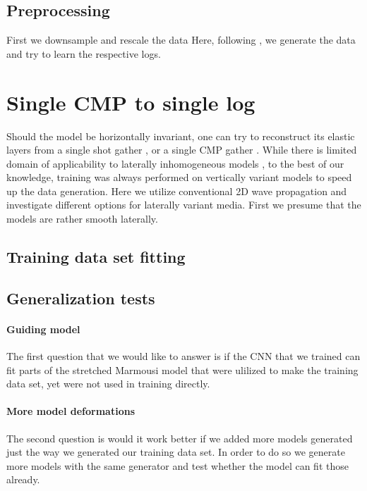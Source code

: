 \documentclass[paper,twocolomn]{geophysics}
\begin{document}
\subsection{Preprocessing}
First we downsample and rescale the data
Here, following \citep{york2019}, we generate the data and try to learn the respective logs.

\section{Single CMP to single log}
Should the model be horizontally invariant, one can try to reconstruct its elastic layers from a single shot gather \citep{roth1994}, or a single CMP gather \citep{york2019}.
While there is limited domain of applicability to laterally inhomogeneous models \citep{york2019}, to the best of our knowledge, training was always performed on vertically variant models to speed up the data generation. Here we utilize conventional 2D wave propagation and investigate different options for laterally variant media. First we presume that the models are rather smooth laterally.
\subsection{Training data set fitting}


\subsection{Generalization tests}

\paragraph{Guiding model}
The first question that we would like to answer is if the CNN that we trained can fit parts of the stretched Marmousi model that were ulilized to make the training data set, yet were not used in training directly.


\paragraph{More model deformations}
The second question is would it work better if we added more models generated just the way we generated our training data set. In order to do so we generate more models with the same generator and test whether the model can fit those already.
\end{document}
